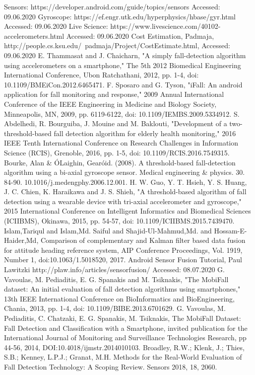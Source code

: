 \documentclass[conference]{IEEEtran}
\begin{document}
\begin{thebibliography}{00}
 Sensors: https://developer.android.com/guide/topics/sensors Accessed: 09.06.2020
 Gyroscope:
https://ef.engr.utk.edu/hyperphysics/hbase/gyr.html Accessed: 09.06.2020
 Live Science: https://www.livescience.com/40102-accelerometers.html Accessed: 09.06.2020
 Cost Estimation, Padmaja,  http://people.cs.ksu.edu/~padmaja/Project/CostEstimate.html,  Accessed: 09.06.2020
E. Thammasat and J. Chaicharn, "A simply fall-detection algorithm using accelerometers on a smartphone," The 5th 2012 Biomedical Engineering International Conference, Ubon Ratchathani, 2012, pp. 1-4, doi: 10.1109/BMEiCon.2012.6465471.
F. Sposaro and G. Tyson, "iFall: An android application for fall monitoring and response," 2009 Annual International Conference of the IEEE Engineering in Medicine and Biology Society, Minneapolis, MN, 2009, pp. 6119-6122, doi: 10.1109/IEMBS.2009.5334912.
S. Abdelhedi, R. Bourguiba, J. Mouine and M. Baklouti, "Development of a two-threshold-based fall detection algorithm for elderly health monitoring," 2016 IEEE Tenth International Conference on Research Challenges in Information Science (RCIS), Grenoble, 2016, pp. 1-5, doi: 10.1109/RCIS.2016.7549315.
Bourke, Alan & ÓLaighin, Gearóid. (2008). A threshold-based fall-detection algorithm using a bi-axial gyroscope sensor. Medical engineering & physics. 30. 84-90. 10.1016/j.medengphy.2006.12.001.
H. W. Guo, Y. T. Hsieh, Y. S. Huang, J. C. Chien, K. Haraikawa and J. S. Shieh, "A threshold-based algorithm of fall detection using a wearable device with tri-axial accelerometer and gyroscope," 2015 International Conference on Intelligent Informatics and Biomedical Sciences (ICIIBMS), Okinawa, 2015, pp. 54-57, doi: 10.1109/ICIIBMS.2015.7439470.
Islam,Tariqul  and Islam,Md. Saiful  and Shajid-Ul-Mahmud,Md.  and Hossam-E-Haider,Md, Comparison of complementary and Kalman filter based data fusion for attitude heading reference system, AIP Conference Proceedings, Vol. 1919, Number 1, doi:10.1063/1.5018520, 2017.
 Android Sensor Fusion Tutorial, Paul Lawitzki http://plaw.info/articles/sensorfusion/ Accessed: 08.07.2020
G. Vavoulas, M. Pediaditis, E. G. Spanakis and M. Tsiknakis, "The MobiFall dataset: An initial evaluation of fall detection algorithms using smartphones," 13th IEEE International Conference on BioInformatics and BioEngineering, Chania, 2013, pp. 1-4, doi: 10.1109/BIBE.2013.6701629.
G. Vavoulas, M. Pediaditis, C. Chatzaki, E. G. Spanakis, M. Tsiknakis, The MobiFall Dataset: Fall Detection and Classification with a Smartphone, invited publication for the International Journal of Monitoring and Surveillance Technologies Research, pp 44-56, 2014, DOI:10.4018/ijmstr.2014010103.
 Broadley, R.W.; Klenk, J.; Thies, S.B.; Kenney, L.P.J.; Granat, M.H. Methods for the Real-World Evaluation of Fall Detection Technology: A Scoping Review. Sensors 2018, 18, 2060.
\end{thebibliography}
\vspace{12pt}
\end{document}
